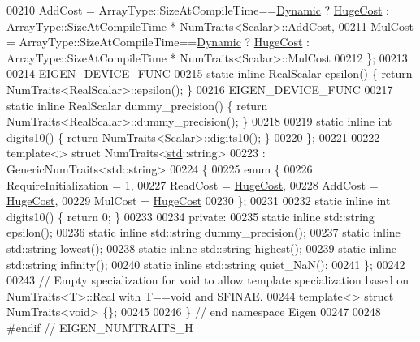 \begin{DoxyCode}
00210     AddCost  = ArrayType::SizeAtCompileTime==\hyperlink{namespace_eigen_ad81fa7195215a0ce30017dfac309f0b2}{Dynamic} ? \hyperlink{namespace_eigen_a3163430a1c13173faffde69016b48aaf}{HugeCost} : 
      ArrayType::SizeAtCompileTime * NumTraits<Scalar>::AddCost,
00211     MulCost  = ArrayType::SizeAtCompileTime==\hyperlink{namespace_eigen_ad81fa7195215a0ce30017dfac309f0b2}{Dynamic} ? \hyperlink{namespace_eigen_a3163430a1c13173faffde69016b48aaf}{HugeCost} : 
      ArrayType::SizeAtCompileTime * NumTraits<Scalar>::MulCost
00212   \};
00213 
00214   EIGEN\_DEVICE\_FUNC
00215   \textcolor{keyword}{static} \textcolor{keyword}{inline} RealScalar epsilon() \{ \textcolor{keywordflow}{return} NumTraits<RealScalar>::epsilon(); \}
00216   EIGEN\_DEVICE\_FUNC
00217   \textcolor{keyword}{static} \textcolor{keyword}{inline} RealScalar dummy\_precision() \{ \textcolor{keywordflow}{return} NumTraits<RealScalar>::dummy\_precision(); \}
00218 
00219   \textcolor{keyword}{static} \textcolor{keyword}{inline} \textcolor{keywordtype}{int} digits10() \{ \textcolor{keywordflow}{return} NumTraits<Scalar>::digits10(); \}
00220 \};
00221 
00222 \textcolor{keyword}{template}<> \textcolor{keyword}{struct }NumTraits<\hyperlink{namespacestd}{std}::string>
00223   : GenericNumTraits<std::string>
00224 \{
00225   \textcolor{keyword}{enum} \{
00226     RequireInitialization = 1,
00227     ReadCost = \hyperlink{namespace_eigen_a3163430a1c13173faffde69016b48aaf}{HugeCost},
00228     AddCost  = \hyperlink{namespace_eigen_a3163430a1c13173faffde69016b48aaf}{HugeCost},
00229     MulCost  = \hyperlink{namespace_eigen_a3163430a1c13173faffde69016b48aaf}{HugeCost}
00230   \};
00231 
00232   \textcolor{keyword}{static} \textcolor{keyword}{inline} \textcolor{keywordtype}{int} digits10() \{ \textcolor{keywordflow}{return} 0; \}
00233 
00234 \textcolor{keyword}{private}:
00235   \textcolor{keyword}{static} \textcolor{keyword}{inline} std::string epsilon();
00236   \textcolor{keyword}{static} \textcolor{keyword}{inline} std::string dummy\_precision();
00237   \textcolor{keyword}{static} \textcolor{keyword}{inline} std::string lowest();
00238   \textcolor{keyword}{static} \textcolor{keyword}{inline} std::string highest();
00239   \textcolor{keyword}{static} \textcolor{keyword}{inline} std::string infinity();
00240   \textcolor{keyword}{static} \textcolor{keyword}{inline} std::string quiet\_NaN();
00241 \};
00242 
00243 \textcolor{comment}{// Empty specialization for void to allow template specialization based on NumTraits<T>::Real with T==void
       and SFINAE.}
00244 \textcolor{keyword}{template}<> \textcolor{keyword}{struct }NumTraits<void> \{\};
00245 
00246 \} \textcolor{comment}{// end namespace Eigen}
00247 
00248 \textcolor{preprocessor}{#endif // EIGEN\_NUMTRAITS\_H}
\end{DoxyCode}
